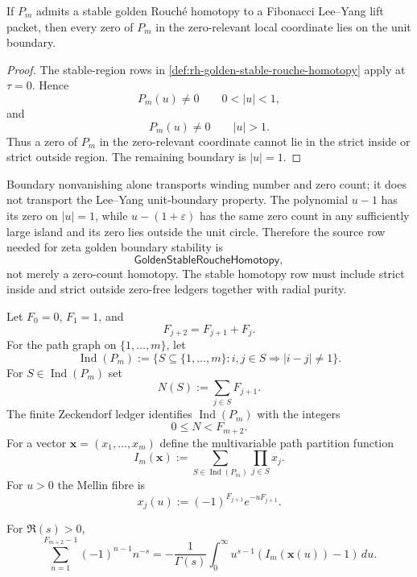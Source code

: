 \begin{theorem}
\label{thm:rh-stable-rouche-transport-preserves-unit-boundary}
If $P_m$ admits a stable golden Rouch\'e homotopy to a Fibonacci
Lee--Yang lift packet, then every zero of $P_m$ in the zero-relevant
local coordinate lies on the unit boundary.
\end{theorem}

\begin{proof}
The stable-region rows in
\autoref{def:rh-golden-stable-rouche-homotopy} apply at $\tau=0$.
Hence
$$
P_m(u)\neq0
\qquad
0<|u|<1,
$$
and
$$
P_m(u)\neq0
\qquad
|u|>1.
$$
Thus a zero of $P_m$ in the zero-relevant coordinate cannot lie in the
strict inside or strict outside region.  The remaining boundary is
$|u|=1$.
\end{proof}

\begin{principle}
\label{prin:rh-ordinary-rouche-transport-insufficient}
Boundary nonvanishing alone transports winding number and zero count; it
does not transport the Lee--Yang unit-boundary property.  The polynomial
$u-1$ has its zero on $|u|=1$, while $u-(1+\varepsilon)$ has the same
zero count in any sufficiently large island and its zero lies outside
the unit circle.  Therefore the source row needed for zeta golden
boundary stability is
$$
\mathsf{GoldenStableRoucheHomotopy},
$$
not merely a zero-count homotopy.  The stable homotopy row must include
strict inside and strict outside zero-free ledgers together with radial
purity.
\end{principle}

\begin{definition}
\label{def:rh-zeckendorf-mellin-path-packet}
Let $F_0=0$, $F_1=1$, and
$$
F_{j+2}=F_{j+1}+F_j.
$$
For the path graph on $\{1,\ldots,m\}$, let
$$
\operatorname{Ind}(P_m)
:=
\{S\subseteq\{1,\ldots,m\}: i,j\in S\Rightarrow |i-j|\neq1\}.
$$
For $S\in\operatorname{Ind}(P_m)$ set
$$
N(S):=\sum_{j\in S}F_{j+1}.
$$
The finite Zeckendorf ledger identifies $\operatorname{Ind}(P_m)$ with
the integers
$$
0\le N<F_{m+2}.
$$
For a vector $\mathbf x=(x_1,\ldots,x_m)$ define the multivariable path
partition function
$$
I_m(\mathbf x)
:=
\sum_{S\in\operatorname{Ind}(P_m)}
\prod_{j\in S}x_j.
$$
For $u>0$ the Mellin fibre is
$$
x_j(u):=(-1)^{F_{j+1}}e^{-uF_{j+1}}.
$$
\end{definition}

\begin{theorem}
\label{thm:rh-zeckendorf-mellin-exact-projection}
For $\Re(s)>0$,
$$
\sum_{n=1}^{F_{m+2}-1}(-1)^{n-1}n^{-s}
=
-\frac1{\Gamma(s)}
\int_0^{\infty}
u^{s-1}
\left(I_m(\mathbf x(u))-1\right)\,du.
$$
\end{theorem}

